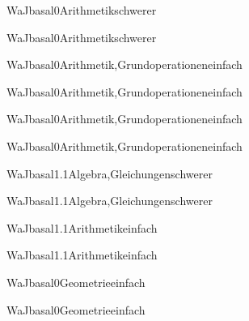 \documentclass[12pt]{article}
\begin{document}
    \begin{Add}{WaJ}{basal0}{Arithmetik}{schwerer}
    \solution{ }
    \end{Add}
    \begin{Add}{WaJ}{basal0}{Arithmetik}{schwerer}
    \end{Add}
    

\begin{Add}{WaJ}{basal0}{Arithmetik,Grundoperationen}{einfach}
\solution{ }
\end{Add}
\begin{Add}{WaJ}{basal0}{Arithmetik,Grundoperationen}{einfach}
\end{Add}

\begin{Add}{WaJ}{basal0}{Arithmetik,Grundoperationen}{einfach}
\solution{ }
\end{Add}
\begin{Add}{WaJ}{basal0}{Arithmetik,Grundoperationen}{einfach}
\end{Add}

\begin{Add}{WaJ}{basal1.1}{Algebra,Gleichungen}{schwerer}
\solution{ }
\end{Add}
\begin{Add}{WaJ}{basal1.1}{Algebra,Gleichungen}{schwerer}
\end{Add}

\begin{Add}{WaJ}{basal1.1}{Arithmetik}{einfach}
\solution{ }
\end{Add}
\begin{Add}{WaJ}{basal1.1}{Arithmetik}{einfach}
\end{Add}

\begin{Add}{WaJ}{basal0}{Geometrie}{einfach}
\solution{ }
\end{Add}
\begin{Add}{WaJ}{basal0}{Geometrie}{einfach}
\end{Add}
\end{document}
